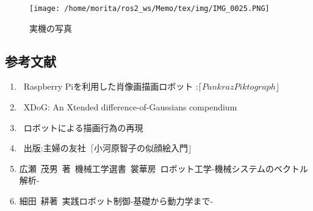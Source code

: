 \documentclass[a4j]{jarticle}			%
\begin{document}
\begin{figure}[htbp]
\begin{center}
\texttt{[image: /home/morita/ros2\_ws/Memo/tex/img/IMG\_0025.PNG]}
\caption{実機の写真}
\end{center}
\end{figure}

\begin{multicols}{2} %

\section{参考文献}

\begin{enumerate}
\item {}\rbrack \ Raspberry Piを利用した肖像画描画ロボット :$ \lceil Pankraz Piktograph \rfloor$ \\
\item {}\rbrack \ XDoG: An Xtended difference-of-Gaussians compendium \\
\item {}\rbrack \ ロボットによる描画行為の再現\\
\item {}\rbrack \ 出版:主婦の友社\ $\lceil \text{小河原智子の似顔絵入門} \rfloor$\\
\item 広瀬\ 茂男\ 著\ 機械工学選書\ 裳華房\ ロボット工学-機械システムのベクトル解析-\\
\item 細田\ 耕著\ 実践ロボット制御-基礎から動力学まで- \\
\end{enumerate}

\end{multicols}
\end{document}
